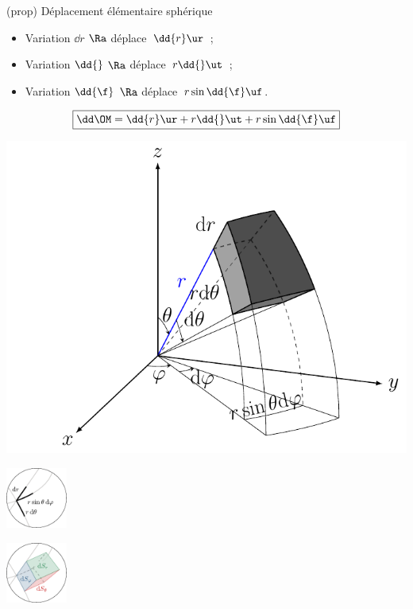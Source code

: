 \documentclass[../../main/main.tex]{subfiles}
\begin{document}
\begin{tcb*}[sidebyside, righthand ratio=.5](prop)
  {Déplacement élémentaire sphérique}
		\begin{itemize}
			\item Variation $\dd{r}$ $\Ra$ déplace\mnt\ $\dd{r}\ur$~;
			\item Variation $\dd{\tt}$ $\Ra$ déplace\mnt\ $r\dd{\tt}\ut$~;
			\item Variation $\dd{\f}$ $\Ra$ déplace\mnt\ $r\sin\tt\dd{\f}\uf$.
		\end{itemize}
		\[\boxed{\dd\OM = \dd{r}\ur + r\dd{\tt}\ut + r\sin\tt\dd{\f}\uf}\]
	\tcblower
  \noindent
  \begin{minipage}{.59\linewidth}
        \begin{center}
        \includegraphics[width=\linewidth]{sph_vol}
        \captionsetup{justification=centering}
      \end{center}
  \end{minipage}
  \begin{minipage}{.39\linewidth}
        \begin{center}
        \includegraphics[height=2cm]{zoom_sph_lgn}
      \end{center}
        \begin{center}
        \includegraphics[height=2cm]{zoom_sph_sfc}
        \captionsetup{justification=centering}
      \end{center}
  \end{minipage}
\end{tcb*}
\end{document}

